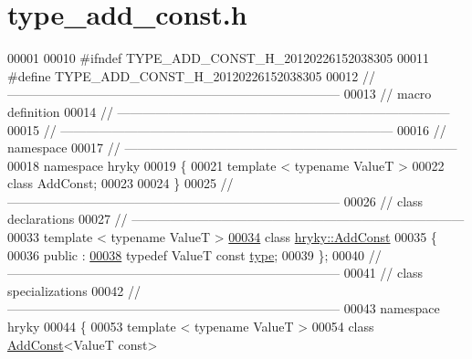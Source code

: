 \hypertarget{type__add__const_8h_source}{\section{type\-\_\-add\-\_\-const.\-h}
}

\begin{DoxyCode}
00001 
00010 \textcolor{preprocessor}{#ifndef TYPE\_ADD\_CONST\_H\_20120226152038305}
00011 \textcolor{preprocessor}{}\textcolor{preprocessor}{#define TYPE\_ADD\_CONST\_H\_20120226152038305}
00012 \textcolor{preprocessor}{}\textcolor{comment}{//
      ------------------------------------------------------------------------------}
00013 \textcolor{comment}{// macro definition}
00014 \textcolor{comment}{//
      ------------------------------------------------------------------------------}
00015 \textcolor{comment}{//
      ------------------------------------------------------------------------------}
00016 \textcolor{comment}{// namespace}
00017 \textcolor{comment}{//
      ------------------------------------------------------------------------------}
00018 \textcolor{keyword}{namespace }hryky
00019 \{
00021     \textcolor{keyword}{template} < \textcolor{keyword}{typename} ValueT >
00022     \textcolor{keyword}{class }AddConst;
00023 
00024 \}
00025 \textcolor{comment}{//
      ------------------------------------------------------------------------------}
00026 \textcolor{comment}{// class declarations}
00027 \textcolor{comment}{//
      ------------------------------------------------------------------------------}
00033 \textcolor{comment}{}\textcolor{keyword}{template} < \textcolor{keyword}{typename} ValueT >
\hypertarget{type__add__const_8h_source_l00034}{}\hyperlink{classhryky_1_1_add_const}{00034} \textcolor{keyword}{class }\hyperlink{classhryky_1_1_add_const}{hryky::AddConst}
00035 \{
00036 \textcolor{keyword}{public} :
\hypertarget{type__add__const_8h_source_l00038}{}\hyperlink{classhryky_1_1_add_const_adb29046fcfdac9d716cb5cb3c28d42ac}{00038}     \textcolor{keyword}{typedef} ValueT \textcolor{keyword}{const}    \hyperlink{classhryky_1_1_add_const_adb29046fcfdac9d716cb5cb3c28d42ac}{type};
00039 \};
00040 \textcolor{comment}{//
      ------------------------------------------------------------------------------}
00041 \textcolor{comment}{// class specializations}
00042 \textcolor{comment}{//
      ------------------------------------------------------------------------------}
00043 \textcolor{keyword}{namespace }hryky
00044 \{
00053 \textcolor{keyword}{template} < \textcolor{keyword}{typename} ValueT >
00054 \textcolor{keyword}{class }\hyperlink{classhryky_1_1_add_const}{AddConst}<ValueT const>

\end{DoxyCode}
